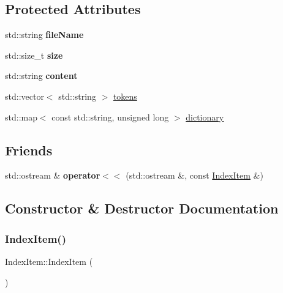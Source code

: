 \subsection*{Protected Attributes}
\begin{DoxyCompactItemize}
\item 
\mbox{\label{classIndexItem_a67e954645b9cd94b033c09dc9734b5ea}} 
std\+::string {\bfseries file\+Name}
\item 
\mbox{\label{classIndexItem_a259507ae46a62a2411a102b17b731c1f}} 
std\+::size\+\_\+t {\bfseries size}
\item 
\mbox{\label{classIndexItem_a0ff78840db32dd97333a49d69e62ffe6}} 
std\+::string {\bfseries content}
\item 
std\+::vector$<$ std\+::string $>$ \hyperlink{classIndexItem_a36ee76ec7176493ed48952d6231c29f2}{tokens}
\item 
std\+::map$<$ const std\+::string, unsigned long $>$ \hyperlink{classIndexItem_a667ce7eb5e6f22b032dcacd042d89cd3}{dictionary}
\end{DoxyCompactItemize}
\subsection*{Friends}
\begin{DoxyCompactItemize}
\item 
\mbox{\label{classIndexItem_acb212461465a08ba81c6b0f35e1151a2}} 
std\+::ostream \& {\bfseries operator$<$$<$} (std\+::ostream \&, const \hyperlink{classIndexItem}{Index\+Item} \&)
\end{DoxyCompactItemize}


\subsection{Constructor \& Destructor Documentation}
\mbox{\label{classIndexItem_aa37a5377a9cdd5993b09baad3d842a6f}} 
\subsubsection{\texorpdfstring{Index\+Item()}{IndexItem()}}
{\footnotesize\ttfamily Index\+Item\+::\+Index\+Item (\begin{DoxyParamCaption}{ }\end{DoxyParamCaption})}

